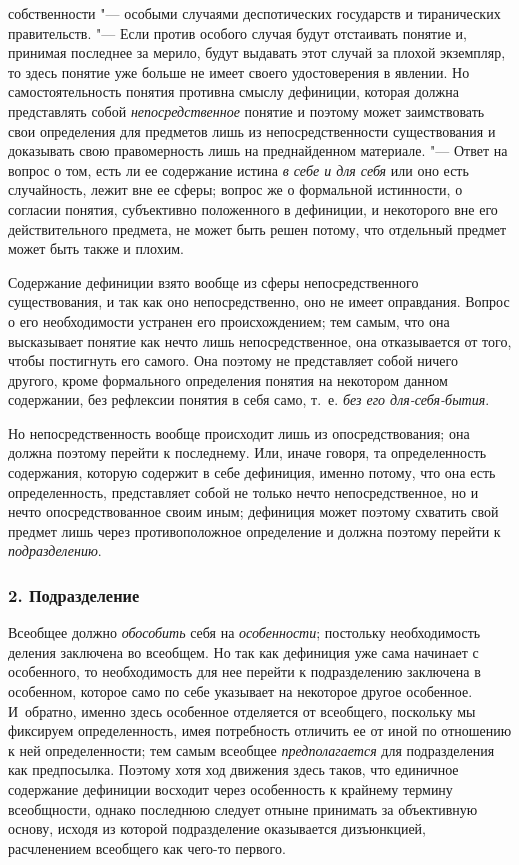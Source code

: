собственности "--- особыми случаями деспотических государств и
тиранических правительств. "--- Если против особого случая
будут отстаивать понятие и, принимая последнее за мерило, будут выдавать
этот случай за плохой экземпляр, то здесь понятие уже больше не имеет
своего удостоверения в явлении. Но самостоятельность понятия противна
смыслу дефиниции, которая должна представлять собой
{\em непосредственное}
понятие и поэтому может заимствовать свои определения для
предметов лишь из непосредственности существования и доказывать свою
правомерность лишь на преднайденном материале. "--- Ответ на
вопрос о том, есть ли ее содержание истина
{\em в себе и для себя}
или оно есть случайность, лежит вне ее сферы; вопрос же о
формальной истинности, о согласии понятия, субъективно положенного в
дефиниции, и некоторого вне его действительного предмета, не может быть
решен потому, что отдельный предмет может быть также и плохим.

Содержание дефиниции взято вообще из сферы непосредственного
существования, и так как оно непосредственно, оно не имеет оправдания.
Вопрос о его необходимости устранен его происхождением; тем самым, что она
высказывает понятие как нечто лишь непосредственное, она отказывается от
того, чтобы постигнуть его самого. Она поэтому не представляет собой ничего
другого, кроме формального определения понятия на некотором данном
содержании, без рефлексии понятия в себя само, т.~е.
{\em без его для-себя-бытия}.

Но непосредственность вообще происходит лишь из
опосредствования; она должна поэтому перейти к последнему. Или,
иначе говоря, та определенность содержания, которую содержит
в себе дефиниция, именно потому, что она есть определенность, представляет
собой не только нечто непосредственное, но и нечто опосредствованное своим
иным; дефиниция может поэтому схватить свой предмет лишь через
противоположное определение и должна поэтому перейти к
{\em подразделению}.


\subsubsection[2. Подразделение]{\bfseries 2. Подразделение}

Всеобщее должно
{\em обособить} себя на
{\em особенности};
постольку необходимость деления заключена во всеобщем. Но так
как дефиниция уже сама начинает с особенного, то необходимость для нее
перейти к подразделению заключена в особенном, которое само по себе
указывает на некоторое другое особенное. И~обратно, именно здесь особенное
отделяется от всеобщего, поскольку мы фиксируем определенность, имея
потребность отличить ее от иной по отношению к ней определенности; тем
самым всеобщее {\em предполагается}
для подразделения как предпосылка. Поэтому хотя ход движения
здесь таков, что единичное содержание дефиниции восходит через особенность
к крайнему термину всеобщности, однако последнюю следует отныне принимать
за объективную основу, исходя из которой подразделение оказывается
дизъюнкцией, расчленением всеобщего как чего-то первого.

